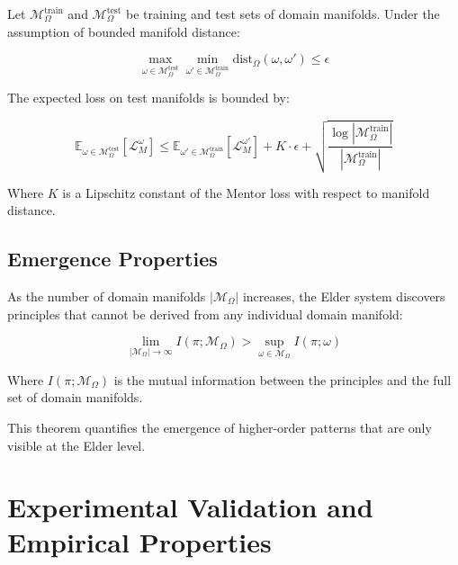 \begin{theorem}
Let $\mathcal{M}_{\Omega}^{\text{train}}$ and $\mathcal{M}_{\Omega}^{\text{test}}$ be training and test sets of domain manifolds. Under the assumption of bounded manifold distance:

\begin{equation}
\max_{\omega \in \mathcal{M}_{\Omega}^{\text{test}}} \min_{\omega' \in \mathcal{M}_{\Omega}^{\text{train}}} \text{dist}_{\Omega}(\omega, \omega') \leq \epsilon
\end{equation}

The expected loss on test manifolds is bounded by:

\begin{equation}
\mathbb{E}_{\omega \in \mathcal{M}_{\Omega}^{\text{test}}} [\mathcal{L}_M^{\omega}] \leq \mathbb{E}_{\omega' \in \mathcal{M}_{\Omega}^{\text{train}}} [\mathcal{L}_M^{\omega'}] + K \cdot \epsilon + \sqrt{\frac{\log|\mathcal{M}_{\Omega}^{\text{train}}|}{|\mathcal{M}_{\Omega}^{\text{train}}|}}
\end{equation}

Where $K$ is a Lipschitz constant of the Mentor loss with respect to manifold distance.
\end{theorem}

\subsection{Emergence Properties}

\begin{theorem}
As the number of domain manifolds $|\mathcal{M}_{\Omega}|$ increases, the Elder system discovers principles that cannot be derived from any individual domain manifold:

\begin{equation}
\lim_{|\mathcal{M}_{\Omega}| \to \infty} I(\pi; \mathcal{M}_{\Omega}) > \sup_{\omega \in \mathcal{M}_{\Omega}} I(\pi; \omega)
\end{equation}

Where $I(\pi; \mathcal{M}_{\Omega})$ is the mutual information between the principles and the full set of domain manifolds.
\end{theorem}

This theorem quantifies the emergence of higher-order patterns that are only visible at the Elder level.

\section{Experimental Validation and Empirical Properties}

